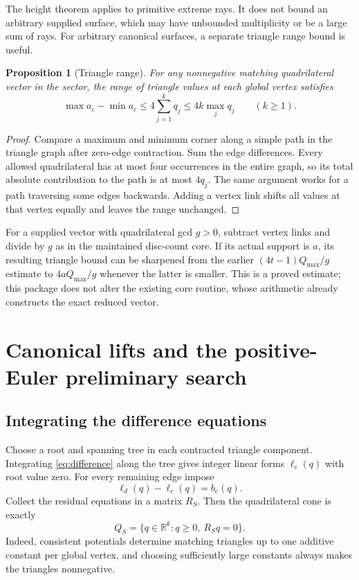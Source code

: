 \documentclass[11pt]{article}
\newtheorem{proposition}[theorem]{Proposition}
\theoremstyle{definition}
\theoremstyle{remark}
\newcommand{\R}{\mathbb R}
\begin{document}
The height theorem applies to primitive extreme rays. It does not bound an
arbitrary supplied surface, which may have unbounded multiplicity or be a
large sum of rays. For arbitrary canonical surfaces, a separate triangle
range bound is useful.

\begin{proposition}[Triangle range]
\label{prop:range}
For any nonnegative matching quadrilateral vector in the sector, the range
of triangle values at each global vertex satisfies
\begin{equation}
 \max a_c-\min a_c\le4\sum_{j=1}^k q_j\le4k\max_j q_j\qquad(k\ge1).
 \label{eq:range}
\end{equation}
\end{proposition}
\begin{proof}
Compare a maximum and minimum corner along a simple path in the triangle
graph after zero-edge contraction. Sum the edge differences. Every allowed
quadrilateral has at most four occurrences in the entire graph, so its total
absolute contribution to the path is at most $4q_j$. The same argument
works for a path traversing some edges backwards. Adding a vertex link shifts
all values at that vertex equally and leaves the range unchanged.
\end{proof}

For a supplied vector with quadrilateral gcd $g>0$, subtract vertex links
and divide by $g$ as in the maintained disc-count core. If its actual support
is $a$, its resulting triangle bound can be sharpened from the earlier
$(4t-1)Q_{\max}/g$ estimate to $4aQ_{\max}/g$ whenever the latter is smaller.
This is a proved estimate; this package does not alter the existing core
routine, whose arithmetic already constructs the exact reduced vector.

\section{Canonical lifts and the positive-Euler preliminary search}
\label{sec:qphase}

\subsection{Integrating the difference equations}

Choose a root and spanning tree in each contracted triangle component.
Integrating \eqref{eq:difference} along the tree gives integer linear forms
$\ell_c(q)$ with root value zero. For every remaining edge impose
\begin{equation}
 \ell_d(q)-\ell_c(q)=b_e(q).
 \label{eq:cycles}
\end{equation}
Collect the residual equations in a matrix $R_S$. Then the quadrilateral
cone is exactly
\begin{equation}
 Q_S=\{q\in\R^k:q\ge0,\ R_Sq=0\}.
 \label{eq:qcone}
\end{equation}
Indeed, consistent potentials determine matching triangles up to one additive
constant per global vertex, and choosing sufficiently large constants always
makes the triangles nonnegative.
\end{document}
